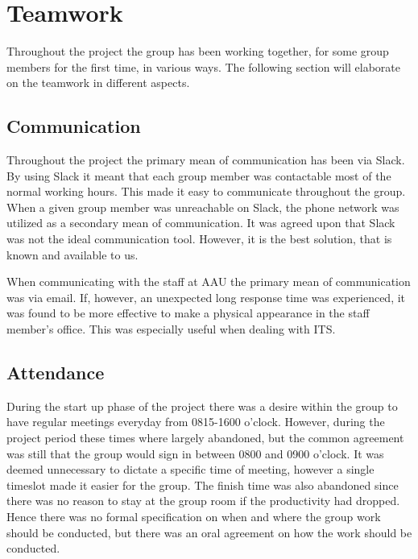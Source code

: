 \section{Teamwork}
Throughout the project the group has been working together, for some group members for the first time, in various ways.
The following section will elaborate on the teamwork in different aspects.

\subsection{Communication}
Throughout the project the primary mean of communication has been via Slack.
By using Slack it meant that each group member was contactable most of the normal working hours.
This made it easy to communicate throughout the group.
When a given group member was unreachable on Slack, the phone network was utilized as a secondary mean of communication.
It was agreed upon that Slack was not the ideal communication tool.
However, it is the best solution, that is known and available to us.

When communicating with the staff at AAU the primary mean of communication was via email.
If, however, an unexpected long response time was experienced, it was found to be more effective to make a physical appearance in the staff member's office.
This was especially useful when dealing with ITS.

\subsection{Attendance}
During the start up phase of the project there was a desire within the group to have regular meetings everyday from 0815-1600 o'clock.
However, during the project period these times where largely abandoned, but the common agreement was still that the group would sign in between 0800 and 0900 o'clock.
It was deemed unnecessary to dictate a specific time of meeting, however a single timeslot made it easier for the group.
The finish time was also abandoned since there was no reason to stay at the group room if the productivity had dropped.
Hence there was no formal specification on when and where the group work should be conducted, but there was an oral agreement on how the work should be conducted.

